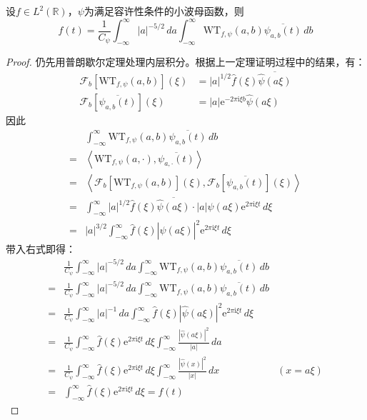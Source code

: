 \documentclass{ctexbook}
\begin{document}
\begin{theorem}[小波变换反演公式]
    设$f\in L^2(\mathbb{R})$，$\psi$为满足容许性条件的小波母函数，则
    \[f(t)=\frac{1}{C_{\psi}}\int_{-\infty}^{\infty}|a|^{-5/2}\,da\int_{-\infty}^{\infty}\mathrm{WT} _{f,\psi}(a,b)\overline{\psi_{a,b}(t)}\,db\]    
\end{theorem}
\begin{proof}
    仍先用普朗歇尔定理处理内层积分。根据上一定理证明过程中的结果，有：
    \begin{align*}
        \mathcal{F} _b[\mathrm{WT} _{f,\psi}(a,b)](\xi)&=|a|^{1/2}\hat{f}(\xi)\overline{\hat{\psi}(a\xi)}\\
        \mathcal{F} _b[\overline{\psi_{a,b}(t)}](\xi)&=|a|\mathrm{e}^{-2\pi \mathrm{i}\xi b}\hat{\psi}(a\xi)
    \end{align*}
    因此
    \begin{align*}
        &\int_{-\infty}^{\infty}\mathrm{WT} _{f,\psi}(a,b)\overline{\psi_{a,b}(t)}\,db\\
        =&\left\langle \mathrm{WT} _{f,\psi}(a,\cdot),\overline{\psi_{a,\cdot}(t)}\right\rangle\\
        =&\left\langle \mathcal{F} _b[\mathrm{WT} _{f,\psi}(a,b)](\xi),\mathcal{F} _b[\overline{\psi_{a,b}(t)}](\xi)\right\rangle\\
        =&\int_{-\infty}^{\infty}|a|^{1/2}\hat{f}(\xi)\overline{\hat{\psi}(a\xi)}\cdot |a| \hat{\psi}(a\xi)\mathrm{e}^{2\pi \mathrm{i}\xi t}\,d\xi\\
        =&|a|^{3/2}\int_{-\infty}^{\infty}\hat{f}(\xi)|\hat{\psi}(a\xi)|^2 \mathrm{e}^{2\pi \mathrm{i}\xi t}\,d\xi
    \end{align*}
    带入右式即得：
    \begin{align*}
        &\frac{1}{C_{\psi}}\int_{-\infty}^{\infty}|a|^{-5/2}\,da\int_{-\infty}^{\infty}\mathrm{WT} _{f,\psi}(a,b)\overline{\psi_{a,b}(t)}\,db\\
        =&\frac{1}{C_{\psi}}\int_{-\infty}^{\infty}|a|^{-5/2}\,da\int_{-\infty}^{\infty}\mathrm{WT} _{f,\psi}(a,b)\overline{\psi_{a,b}(t)}\,db\\
        =&\frac{1}{C_{\psi}}\int_{-\infty}^{\infty}|a|^{-1}\,da\int_{-\infty}^{\infty}\hat{f}(\xi)|\hat{\psi}(a\xi)|^2 \mathrm{e}^{2\pi \mathrm{i}\xi t}\,d\xi\\
        =&\frac{1}{C_{\psi}}\int_{-\infty}^{\infty}\hat{f}(\xi)\mathrm{e}^{2\pi \mathrm{i}\xi t}\,d\xi\int_{-\infty}^{\infty}\frac{|\hat{\psi}(a\xi)|^2}{|a|}\,da\\
        =&\frac{1}{C_{\psi}}\int_{-\infty}^{\infty}\hat{f}(\xi)\mathrm{e}^{2\pi \mathrm{i}\xi t}\,d\xi\int_{-\infty}^{\infty}\frac{|\hat{\psi}(x)|^2}{|x|}\,dx&(x=a\xi)\\
        =&\int_{-\infty}^{\infty}\hat{f}(\xi)\mathrm{e}^{2\pi \mathrm{i}\xi t}\,d\xi=f(t)
    \end{align*}
\end{proof}
\end{document}

